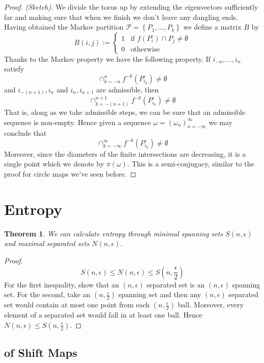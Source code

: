 \documentclass[11pt]{article}
\newcommand{\defeq}{:=}
\newtheorem{theorem}{Theorem}[section]
\begin{document}
\begin{proof}
\textit{(Sketch).}
We divide the torus up by extending the eigenvectors sufficiently far and making sure that when we finish we don't leave any dangling ends.
Having obtained the Markov partition $\mathcal{P}=\left\{P_1, \dots, P_k\right\}$ we define a matrix $B$ by
\[
	B(i,j)\defeq
	\begin{cases}
		1 & \text{if }f(P_i^\circ)\cap P_j\neq \emptyset \\
		0 & \text{otherwise}
	\end{cases}
\]
Thanks to the Markov property we have the following property.
If $i_{-n}, \dots, i_n$ satisfy
\[
	\cap_{k=-n}^n f^{-k}(P_{i_k}^\circ)\neq\emptyset
\]
and $i_{-(n+1)}, i_n$ and $i_n, i_{n+1}$ are admissible, then
\[
	\cap_{k=-(n+1)}^{n+1} f^{-k}(P_{i_k}^\circ)\neq\emptyset
\]
That is, along as we take admissible steps, we can be sure that an admissible sequence is non-empty.
Hence given a sequence $\omega=(\omega_n)_{n=-\infty}^\infty$ we may conclude that
\[
	\cap_{k=-\infty}^{\infty} f^{-k}(P_{i_k}^\circ)\neq\emptyset
\]
Moreover, since the diameters of the finite intersections are decreasing, it is a single point which we denote by $\pi(\omega)$.
This is a semi-conjugacy, similar to the proof for circle maps we've seen before.
\end{proof}

\section{Entropy}

\begin{theorem}
We can calculate entropy through minimal spanning sets $S(n,\epsilon)$ and maximal separated sets $N(n,\epsilon)$.
\end{theorem}

\begin{proof}
\[
	S(n,\epsilon) \leq N(n,\epsilon) \leq S\left(n, \frac{\epsilon}{2}\right)
\]
For the first inequality, show that an $(n,\epsilon)$ separated set is an $(n,\epsilon)$ spanning set.
For the second, take an $(n, \frac{\epsilon}{2})$ spanning set and then any $(n,\epsilon)$ separated set would contain at most one point from each $(n, \frac{\epsilon}{2})$ ball.
Moreover, every element of a separated set would fall in at least one ball.
Hence $N(n, \epsilon) \leq S\left(n, \frac{\epsilon}{2}\right)$.
\end{proof}

\subsection{of Shift Maps}
\end{document}
